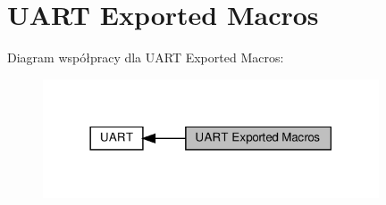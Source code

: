 \hypertarget{group___u_a_r_t___exported___macros}{}\section{U\+A\+RT Exported Macros}
\label{group___u_a_r_t___exported___macros}
Diagram współpracy dla U\+A\+RT Exported Macros\+:\nopagebreak
\begin{figure}[H]
\begin{center}
\leavevmode
\includegraphics[width=282pt]{group___u_a_r_t___exported___macros}
\end{center}
\end{figure}
